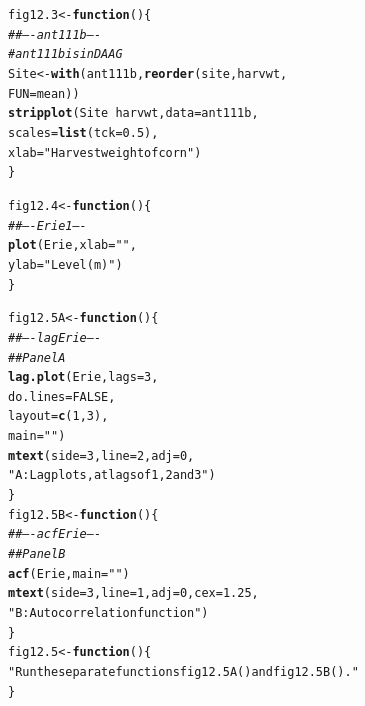 \documentclass[12pt, a4paper,  BCOR=8.25mm, DIV=15]{scrartcl}\usepackage[]{graphicx}\usepackage[]{color}
\makeatletter
\newcommand{\hlnum}[1]{\textcolor[rgb]{0.686,0.059,0.569}{#1}}%
\newcommand{\hlstr}[1]{\textcolor[rgb]{0.192,0.494,0.8}{#1}}%
\newcommand{\hlcom}[1]{\textcolor[rgb]{0.678,0.584,0.686}{\textit{#1}}}%
\newcommand{\hlopt}[1]{\textcolor[rgb]{0,0,0}{#1}}%
\newcommand{\hlstd}[1]{\textcolor[rgb]{0.345,0.345,0.345}{#1}}%
\newcommand{\hlkwa}[1]{\textcolor[rgb]{0.161,0.373,0.58}{\textbf{#1}}}%
\newcommand{\hlkwb}[1]{\textcolor[rgb]{0.69,0.353,0.396}{#1}}%
\newcommand{\hlkwc}[1]{\textcolor[rgb]{0.333,0.667,0.333}{#1}}%
\newcommand{\hlkwd}[1]{\textcolor[rgb]{0.737,0.353,0.396}{\textbf{#1}}}%
\newenvironment{kframe}{%
 \def\at@end@of@kframe{}%
 \ifinner\ifhmode%
  \def\at@end@of@kframe{\end{minipage}}%
  \begin{minipage}{\columnwidth}%
 \fi\fi%
 \def\FrameCommand##1{\hskip\@totalleftmargin \hskip-\fboxsep
 \colorbox{shadecolor}{##1}\hskip-\fboxsep
     \hskip-\linewidth \hskip-\@totalleftmargin \hskip\columnwidth}%
 \MakeFramed {\advance\hsize-\width
   \@totalleftmargin\z@ \linewidth\hsize
   \@setminipage}}%
 {\par\unskip\endMakeFramed%
 \at@end@of@kframe}
\newenvironment{knitrout}{}{} %
\makeatother
\begin{document}
\begin{knitrout}
\color{fgcolor}\begin{kframe}
\begin{alltt}
\hlstd{fig12.3} \hlkwb{<-} \hlkwa{function}\hlstd{()\{}
\hlcom{## ---- ant111b ----}
\hlcom{# ant111b is in DAAG}
\hlstd{Site} \hlkwb{<-} \hlkwd{with}\hlstd{(ant111b,} \hlkwd{reorder}\hlstd{(site, harvwt,}
                              \hlkwc{FUN}\hlstd{=mean))}
\hlkwd{stripplot}\hlstd{(Site} \hlopt{~} \hlstd{harvwt,} \hlkwc{data}\hlstd{=ant111b,}
          \hlkwc{scales}\hlstd{=}\hlkwd{list}\hlstd{(}\hlkwc{tck}\hlstd{=}\hlnum{0.5}\hlstd{),}
          \hlkwc{xlab}\hlstd{=}\hlstr{"Harvest weight of corn"}\hlstd{)}
\hlstd{\}}
\end{alltt}
\end{kframe}
\end{knitrout}

\begin{knitrout}
\color{fgcolor}\begin{kframe}
\begin{alltt}
\hlstd{fig12.4} \hlkwb{<-} \hlkwa{function}\hlstd{()\{}
\hlcom{## ---- Erie1 ----}
\hlkwd{plot}\hlstd{(Erie,} \hlkwc{xlab}\hlstd{=}\hlstr{""}\hlstd{,}
     \hlkwc{ylab}\hlstd{=}\hlstr{"Level (m)"}\hlstd{)}
\hlstd{\}}
\end{alltt}
\end{kframe}
\end{knitrout}

\begin{knitrout}
\color{fgcolor}\begin{kframe}
\begin{alltt}
\hlstd{fig12.5A} \hlkwb{<-} \hlkwa{function}\hlstd{()\{}
\hlcom{## ---- lagErie ----}
\hlcom{## Panel A}
\hlkwd{lag.plot}\hlstd{(Erie,} \hlkwc{lags}\hlstd{=}\hlnum{3}\hlstd{,}
         \hlkwc{do.lines}\hlstd{=}\hlnum{FALSE}\hlstd{,}
         \hlkwc{layout}\hlstd{=}\hlkwd{c}\hlstd{(}\hlnum{1}\hlstd{,}\hlnum{3}\hlstd{),}
         \hlkwc{main}\hlstd{=}\hlstr{"  "}\hlstd{)}
\hlkwd{mtext}\hlstd{(}\hlkwc{side}\hlstd{=}\hlnum{3}\hlstd{,} \hlkwc{line}\hlstd{=}\hlnum{2}\hlstd{,} \hlkwc{adj}\hlstd{=}\hlnum{0}\hlstd{,}
      \hlstr{"A: Lag plots, at lags of 1, 2 and 3"}\hlstd{)}
\hlstd{\}}
\hlstd{fig12.5B} \hlkwb{<-} \hlkwa{function}\hlstd{()\{}
\hlcom{## ---- acfErie ----}
\hlcom{## Panel B}
\hlkwd{acf}\hlstd{(Erie,} \hlkwc{main}\hlstd{=}\hlstr{""}\hlstd{)}
\hlkwd{mtext}\hlstd{(}\hlkwc{side}\hlstd{=}\hlnum{3}\hlstd{,} \hlkwc{line}\hlstd{=}\hlnum{1}\hlstd{,} \hlkwc{adj}\hlstd{=}\hlnum{0}\hlstd{,} \hlkwc{cex}\hlstd{=}\hlnum{1.25}\hlstd{,}
      \hlstr{"B: Autocorrelation function"}\hlstd{)}
\hlstd{\}}
\hlstd{fig12.5} \hlkwb{<-} \hlkwa{function}\hlstd{()\{}
\hlstr{"Run the separate functions fig12.5A() and fig12.5B()."}
\hlstd{\}}
\end{alltt}
\end{kframe}
\end{knitrout}
\end{document}
